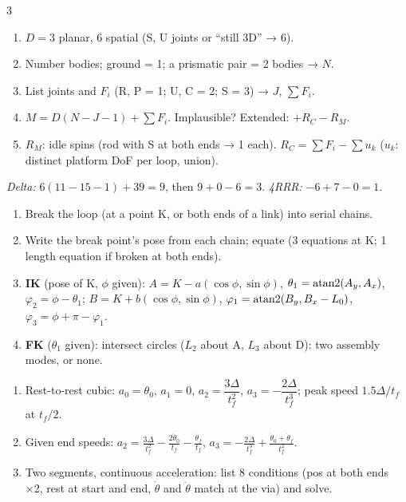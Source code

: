\begin{multicols}{3}
\columnbreak
\begin{recipe}[5 · Mobility (W13 Q6, Q7)]\label{r:gk}
\begin{enumerate}
\item $D=3$ planar, 6 spatial (S, U joints or ``still 3D'' → 6).
\item Number bodies; ground = 1; a prismatic pair = 2 bodies → $N$.
\item List joints and $F_i$ (R, P = 1; U, C = 2; S = 3) → $J$, $\sum F_i$.
\item $M=D(N-J-1)+\sum F_i$. Implausible? Extended: $+R_C-R_M$.
\item $R_M$: idle spins (rod with S at both ends → 1 each). $R_C=\sum F_i-\sum u_k$ ($u_k$: distinct platform DoF per loop, union).
\end{enumerate}
\textit{Delta:} $6(11-15-1)+39=9$, then $9+0-6=3$. \textit{4RRR:} $-6+7-0=1$.
\end{recipe}
\begin{recipe}\label{r:fourbar}
\begin{enumerate}
\item Break the loop (at a point K, or both ends of a link) into serial chains.
\item Write the break point's pose from each chain; equate (3 equations at K; 1 length equation if broken at both ends).
\item \textbf{IK} (pose of K, $\phi$ given): $A=K-a(\cos\phi,\sin\phi)$, $\theta_1=\operatorname{atan2}(A_y,A_x)$, $\varphi_2=\phi-\theta_1$; $B=K+b(\cos\phi,\sin\phi)$, $\varphi_1=\operatorname{atan2}(B_y,B_x-L_0)$, $\varphi_3=\phi+\pi-\varphi_1$.
\item \textbf{FK} ($\theta_1$ given): intersect circles ($L_2$ about A, $L_3$ about D): two assembly modes, or none.
\end{enumerate}
\end{recipe}
\begin{recipe}[7 · Trajectories (W13 Q8, Q9)]\label{r:cubic}
\begin{enumerate}
\item Rest-to-rest cubic: $a_0=\theta_0$, $a_1=0$, $a_2=\dfrac{3\Delta}{t_f^2}$, $a_3=-\dfrac{2\Delta}{t_f^3}$; peak speed $1.5\Delta/t_f$ at $t_f/2$.
\item Given end speeds: $a_2=\frac{3\Delta}{t_f^2}-\frac{2\dot\theta_0}{t_f}-\frac{\dot\theta_f}{t_f}$, $a_3=-\frac{2\Delta}{t_f^3}+\frac{\dot\theta_0+\dot\theta_f}{t_f^2}$.
\item Two segments, continuous acceleration: list 8 conditions (pos at both ends ×2, rest at start and end, $\dot\theta$ and $\ddot\theta$ match at the via) and solve.

\end{enumerate}
\end{recipe}
\end{multicols}
